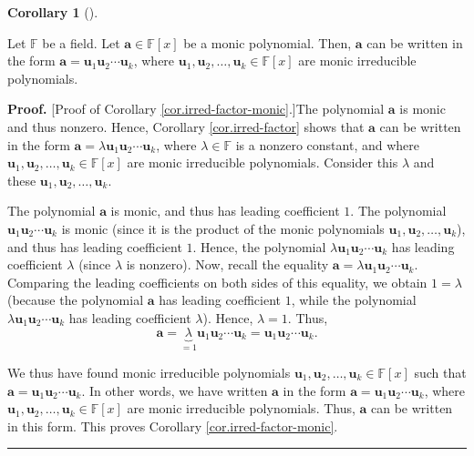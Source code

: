 \documentclass[numbers=enddot,12pt,final,onecolumn,notitlepage]{scrartcl}%
\theoremstyle{definition}
\newtheorem{coro}[theo]{Corollary}
\newenvironment{corollary}[1][]
{\begin{coro}[#1]\begin{leftbar}}
{\end{leftbar}\end{coro}}
\newenvironment{proof}[1][Proof]{\noindent\textbf{#1.} }{\ \rule{0.5em}{0.5em}}
\begin{document}
\begin{corollary}
\label{cor.irred-factor-monic}Let $\mathbb{F}$ be a field. Let $\mathbf{a}%
\in\mathbb{F}\left[  x\right]  $ be a monic polynomial. Then, $\mathbf{a}$ can
be written in the form $\mathbf{a}=\mathbf{u}_{1}\mathbf{u}_{2}\cdots
\mathbf{u}_{k}$, where $\mathbf{u}_{1},\mathbf{u}_{2},\ldots,\mathbf{u}_{k}%
\in\mathbb{F}\left[  x\right]  $ are monic irreducible polynomials.
\end{corollary}

\begin{proof}
[Proof of Corollary \ref{cor.irred-factor-monic}.]The polynomial $\mathbf{a}$
is monic and thus nonzero. Hence, Corollary \ref{cor.irred-factor} shows that
$\mathbf{a}$ can be written in the form $\mathbf{a}=\lambda\mathbf{u}%
_{1}\mathbf{u}_{2}\cdots\mathbf{u}_{k}$, where $\lambda\in\mathbb{F}$ is a
nonzero constant, and where $\mathbf{u}_{1},\mathbf{u}_{2},\ldots
,\mathbf{u}_{k}\in\mathbb{F}\left[  x\right]  $ are monic irreducible
polynomials. Consider this $\lambda$ and these $\mathbf{u}_{1},\mathbf{u}%
_{2},\ldots,\mathbf{u}_{k}$.

The polynomial $\mathbf{a}$ is monic, and thus has leading coefficient $1$.
The polynomial $\mathbf{u}_{1}\mathbf{u}_{2}\cdots\mathbf{u}_{k}$ is monic
(since it is the product of the monic polynomials $\mathbf{u}_{1}%
,\mathbf{u}_{2},\ldots,\mathbf{u}_{k}$), and thus has leading coefficient $1$.
Hence, the polynomial $\lambda\mathbf{u}_{1}\mathbf{u}_{2}\cdots\mathbf{u}%
_{k}$ has leading coefficient $\lambda$ (since $\lambda$ is nonzero). Now,
recall the equality $\mathbf{a}=\lambda\mathbf{u}_{1}\mathbf{u}_{2}%
\cdots\mathbf{u}_{k}$. Comparing the leading coefficients on both sides of
this equality, we obtain $1=\lambda$ (because the polynomial $\mathbf{a}$ has
leading coefficient $1$, while the polynomial $\lambda\mathbf{u}_{1}%
\mathbf{u}_{2}\cdots\mathbf{u}_{k}$ has leading coefficient $\lambda$). Hence,
$\lambda=1$. Thus,%
\[
\mathbf{a}=\underbrace{\lambda}_{=1}\mathbf{u}_{1}\mathbf{u}_{2}%
\cdots\mathbf{u}_{k}=\mathbf{u}_{1}\mathbf{u}_{2}\cdots\mathbf{u}_{k}.
\]


We thus have found monic irreducible polynomials $\mathbf{u}_{1}%
,\mathbf{u}_{2},\ldots,\mathbf{u}_{k}\in\mathbb{F}\left[  x\right]  $ such
that $\mathbf{a}=\mathbf{u}_{1}\mathbf{u}_{2}\cdots\mathbf{u}_{k}$. In other
words, we have written $\mathbf{a}$ in the form $\mathbf{a}=\mathbf{u}%
_{1}\mathbf{u}_{2}\cdots\mathbf{u}_{k}$, where $\mathbf{u}_{1},\mathbf{u}%
_{2},\ldots,\mathbf{u}_{k}\in\mathbb{F}\left[  x\right]  $ are monic
irreducible polynomials. Thus, $\mathbf{a}$ can be written in this form. This
proves Corollary \ref{cor.irred-factor-monic}.
\end{proof}
\end{document}
